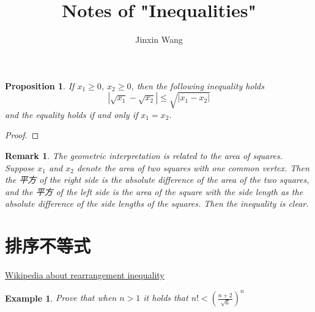 \documentclass[onecolumn]{ctexart}
\title{Notes of "Inequalities"}
\author{Jinxin Wang}
\date{}
\newtheorem{proposition}{Proposition}
\newtheorem{remark}{Remark}
\newtheorem{example}{Example}
\begin{document}
\maketitle

\begin{proposition}
  If $x_1 \geq 0$, $x_2 \geq 0$, then the following inequality holds
  \begin{equation}
    |\sqrt{x_1} - \sqrt{x_2}| \leq \sqrt{|x_1 - x_2|}
  \end{equation}
  and the equality holds if and only if $x_1 = x_2$.
\end{proposition}
\begin{proof}
  
\end{proof}
\begin{remark}
  The geometric interpretation is related to the area of squares. Suppose $x_1$ 
  and $x_2$ denote the area of two squares with one common vertex. Then the 平方 
  of the right side is the absolute difference of the area of the two squares, 
  and the 平方 of the left side is the area of the square with the side length as 
  the absolute difference of the side lengths of the squares. Then the inequality 
  is clear.
\end{remark}

\section{排序不等式}
\href{https://en.wikipedia.org/wiki/Rearrangement_inequality}{Wikipedia about rearrangement inequality}

\begin{example}
  Prove that when $n > 1$ it holds that $n! < (\frac{n+2}{\sqrt{6}})^n$
\end{example}
\end{document}
